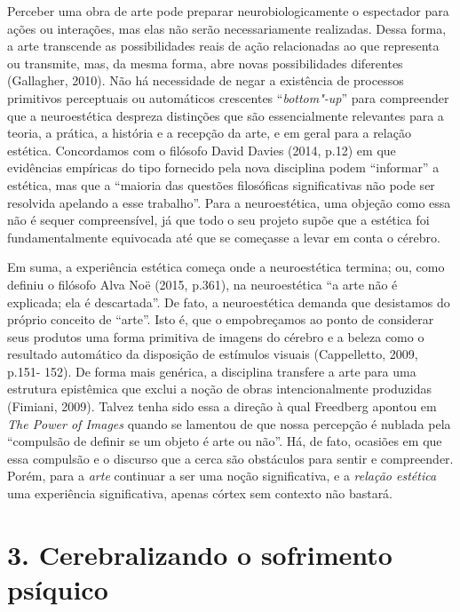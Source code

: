 Perceber uma obra de arte pode preparar neurobiologicamente o espectador
para ações ou interações, mas elas não serão necessariamente realizadas.
Dessa forma, a arte transcende as possibilidades reais de ação
relacionadas ao que representa ou transmite, mas, da mesma forma, abre
novas possibilidades diferentes (Gallagher, 2010). Não há necessidade de
negar a existência de processos primitivos perceptuais ou automáticos
crescentes ``\emph{bottom"-up}'' para compreender que a neuroestética
despreza distinções que são essencialmente relevantes para a teoria, a
prática, a história e a recepção da arte, e em geral para a relação
estética. Concordamos com o filósofo David Davies (2014, p.12) em que
evidências empíricas do tipo fornecido pela nova disciplina podem
``informar'' a estética, mas que a ``maioria das questões filosóficas
significativas não pode ser resolvida apelando a esse trabalho''. Para a
neuroestética, uma objeção como essa não é sequer compreensível, já que
todo o seu projeto supõe que a estética foi fundamentalmente equivocada
até que se começasse a levar em conta o cérebro.

Em suma, a experiência estética começa onde a neuroestética termina; ou,
como definiu o filósofo Alva Noë (2015, p.361), na neuroestética ``a
arte não é explicada; ela é descartada''. De fato, a neuroestética
demanda que desistamos do próprio conceito de ``arte''. Isto é, que o
empobreçamos ao ponto de considerar seus produtos uma forma primitiva de
imagens do cérebro e a beleza como o resultado automático da disposição
de estímulos visuais (Cappelletto, 2009, p.151- 152). De forma mais
genérica, a disciplina transfere a arte para uma estrutura epistêmica
que exclui a noção de obras intencionalmente produzidas (Fimiani, 2009).
Talvez tenha sido essa a direção à qual Freedberg apontou em \emph{The
Power of Images} quando se lamentou de que nossa percepção é nublada
pela ``compulsão de definir se um objeto é arte ou não''. Há, de fato,
ocasiões em que essa compulsão e o discurso que a cerca são obstáculos
para sentir e compreender. Porém, para a \emph{arte} continuar a ser uma
noção significativa, e a \emph{relação estética} uma experiência
significativa, apenas córtex sem contexto não bastará.

\part{3. Cerebralizando o sofrimento psíquico}

\chapter*{}

